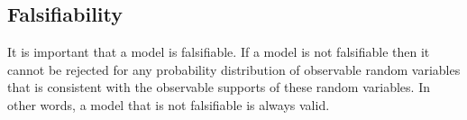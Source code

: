 \documentclass[10pt,a4paper,twoside]{article}
\newcommand\independent{\protect\mathpalette{\protect\independenT}{\perp}}
\def\independenT#1#2{\mathrel{\rlap{$#1#2$}\mkern2mu{#1#2}}}
\numberwithin{equation}{section}
\begin{document}
\subsection{Falsifiability}
It is important that a model is falsifiable. If a model is not falsifiable then it cannot be rejected for any probability distribution of observable random variables that is consistent with the observable supports of these random variables. In other words, a model that is not falsifiable is always valid. 
\end{document}
